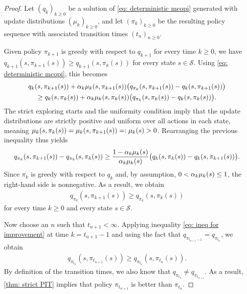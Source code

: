 \begin{proof}
Let $(q_k)_{k \ge 0}$ be a solution of \eqref{eq: deterministic mcopi} generated with update distributions $(\mu_k)_{k \ge 0}$, and let $(\pi_k)_{k \ge 0}$ be the resulting policy sequence with associated transition times $(t_n)_{n \ge 0}$.


Given policy $\pi_{k+1}$ is greedy with respect to $q_{k+1}$ for every time $k \ge 0$, we have $q_{k+1}(s,\pi_{k+1}(s)) \ge q_{k+1}(s, \pi_k(s))$ for every state $s \in \mathcal S$.
Using \eqref{eq: deterministic mcopi}, this becomes
\begin{multline*}
    q_k(s, \pi_{k+1}(s)) + \alpha_k \mu_k(s, \pi_{k+1}(s)) \big( q_{\pi_k}(s, \pi_{k+1}(s)) - q_k(s, \pi_{k+1}(s)) \big)
    \\
    \ge
    q_k(s, \pi_k(s)) + \alpha_k \mu_k(s, \pi_k(s)) \big( q_{\pi_k}(s, \pi_k(s)) - q_k(s, \pi_k(s)) \big) .
\end{multline*}
The strict exploring starts and the uniformity condition
imply that the update distributions are strictly positive and uniform over all actions in each state, meaning
$\mu_k(s,\pi_k(s)) = \mu_k(s,\pi_{k+1}(s)) =: \mu_k(s) > 0$.
Rearranging the previous inequality thus yields
\begin{align*}    
    q_{\pi_k}(s, \pi_{k+1}(s)) - q_{\pi_k}(s, \pi_k(s))
    \ge
    \dfrac{1 - \alpha_k \mu_k(s)}{\alpha_k \mu_k(s)} \big( q_k(s, \pi_k(s)) - q_k(s, \pi_{k+1}(s)) \big) .
\end{align*}
Since $\pi_k$ is greedy with respect to $q_k$ and, by assumption, $0 < \alpha_k \mu_k(s) \le 1$, the right-hand side is nonnegative. As a result, we obtain
\begin{align}
\label{eq: ineq for improvement}
    q_{\pi_k}(s, \pi_{k+1}(s)) \ge q_{\pi_k}(s, \pi_k(s))
\end{align}
for every time $k \ge 0$ and every state $s \in \mathcal S$.

Now choose an $n$ such that $t_{n+1}<\infty$. Applying inequality \eqref{eq: ineq for improvement} at time $k=t_{n+1}-1$ and using the fact that $q_{\pi_{t_{n+1}-1}}=q_{\pi_{t_n}}$, we obtain
\begin{align*}
    q_{\pi_{t_n}}(s,\pi_{t_{n+1}}(s)) \ge q_{\pi_{t_{n}}}(s,\pi_{t_n}(s)) .
\end{align*}
By definition of the transition times, we also know that $q_{\pi_{t_n}} \neq q_{\pi_{t_{n+1}}}$.
As a result, \autoref{thm: strict PIT} implies that policy $\pi_{t_{n+1}}$ is better than $\pi_{t_n}$.
\end{proof}


